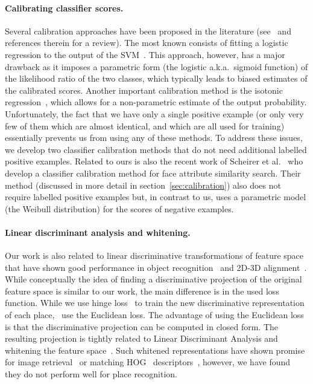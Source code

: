   \paragraph{Calibrating classifier scores.} 
    Several calibration approaches have been proposed in the literature (see~\cite{gebel2007calibrating} and references therein for a review). The most known consists of fitting a logistic regression to the output of the SVM~\cite{Platt99}.  This approach, however, has a major drawback as it imposes a parametric form (the logistic a.k.a.\ sigmoid function) of the likelihood ratio of the two classes, which typically leads to biased estimates of the calibrated scores. Another important calibration method is the isotonic regression~\cite{zadrozny2002transforming}, which allows for a non-parametric estimate of the output probability.
    Unfortunately, the fact that we have only a single positive example (or only very few of them which are almost identical, and which are all used for training) essentially prevents us from using any of these methods. 
    To address these issues, we develop two classifier calibration methods that do not need additional labelled positive examples. Related to ours is also the recent work of Scheirer et al.~\cite{Scheirer12} who develop a classifier calibration method for face attribute similarity search. Their method (discussed in more detail in section~\ref{sec:calibration}) also does not require labelled positive examples but, in contrast to us, uses a parametric model (the Weibull distribution) for the scores of negative examples.    
  

  \paragraph{Linear discriminant analysis and whitening.}
    {
      Our work is also related to linear discriminative transformations of feature space that have shown good performance in object recognition~\cite{Gharbi12,Hariharan12} and 2D-3D alignment~\cite{Aubry13,Aubry14}. While conceptually the idea of finding a discriminative projection of the original feature space is similar to our work, the main difference is in the used loss function. 
      While we use hinge loss~\cite{scholkopf2002learning} to train the new discriminative representation of each place,~\cite{Aubry13,Gharbi12,Hariharan12} use the Euclidean loss. The advantage of using the Euclidean loss is that the discriminative projection can be computed in closed form. The resulting projection is tightly related to Linear Discriminant Analysis and whitening the feature space~\cite{Aubry13,Gharbi12,Hariharan12}. Such whitened representations have shown promise for image retrieval~\cite{JegouChum12} or matching HOG~\cite{Dalal05} descriptors~\cite{Doersch13}, however, we have found they do not perform well for place recognition.
    }

